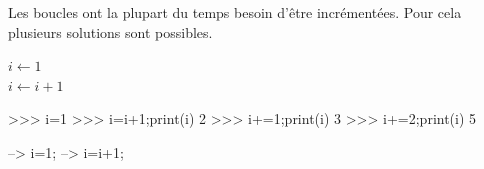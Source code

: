 \documentclass[10pt,fleqn]{article} %
\begin{document}
\begin{rem}
Les boucles ont la plupart du temps besoin d'être incrémentées. Pour cela plusieurs solutions sont possibles.

\begin{minipage}[c]{.3\linewidth}
\begin{pseudo}
\begin{algorithm}[H]
$i \gets 1$\\
$i \gets i+1$\\
\end{algorithm}
\end{pseudo}
\end{minipage} \hfill
\begin{minipage}[c]{.3\linewidth}
\begin{py}
\begin{python}
>>> i=1
>>> i=i+1;print(i)
    2
>>> i+=1;print(i)
    3
>>> i+=2;print(i)
    5
\end{python}
\end{py}
\end{minipage} \hfill
\begin{minipage}[c]{.3\linewidth}
\begin{sci}
\begin{scilab}
--> i=1;
--> i=i+1;
\end{scilab}
\end{sci}
\end{minipage} 

\end{rem}
\end{document}
